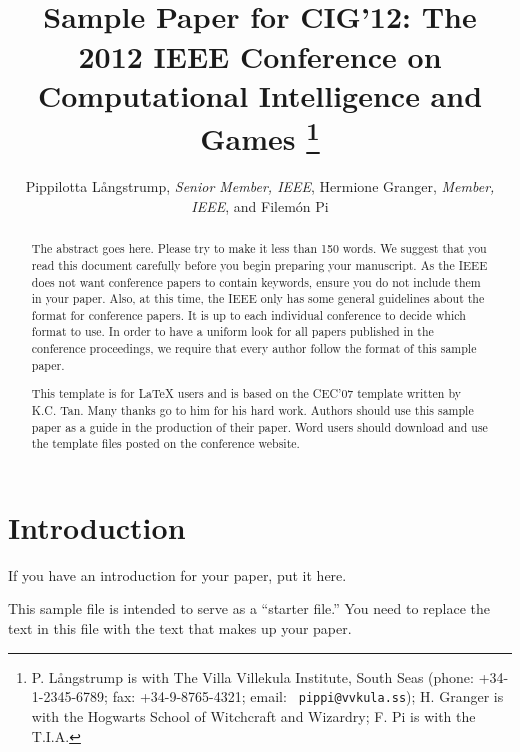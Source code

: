 \documentclass[conference]{IEEEtran}
\begin{document}
\title{\ \\ \LARGE\bf Sample Paper for CIG'12: The 2012 IEEE
Conference on Computational Intelligence and Games \thanks{P. L{\aa}ngstrump
is with The Villa Villekula Institute, South Seas
(phone: +34-1-2345-6789; fax: +34-9-8765-4321; email: {\tt
pippi@vvkula.ss}); H. Granger is with the Hogwarts School of Witchcraft and Wizardry; F. Pi is with the T.I.A.}}

\author{Pippilotta L{\aa}ngstrump, {\it Senior Member, IEEE}, Hermione Granger, {\it Member, IEEE}, and Filem\'{o}n Pi}


\maketitle

\begin{abstract}
The abstract goes here.  Please try to make it less than 150 words.
We suggest that you read this document carefully before you begin
preparing your manuscript.  As the IEEE does not want conference papers
to contain keywords, ensure you do not include them in your paper.
Also, at this time, the IEEE only has some general guidelines about the
format for conference papers.  It is up to each individual conference
to decide which format to use.  In order to have a uniform look for all
papers published in the conference proceedings, we require that every
author follow the format of this sample paper.

This template is for LaTeX users and is based on the CEC'07 template
written by K.C. Tan. Many thanks go to him for his hard work.
Authors should use this sample paper as a guide in the production of
their paper. Word users should download and use the template files
posted on the conference website.
\end{abstract}


\section{Introduction}
If you have an introduction for your paper, put it here.

This sample file is intended to serve as a ``starter file.''  You
need to replace the text in this file with the text that makes up
your paper.
\end{document}
